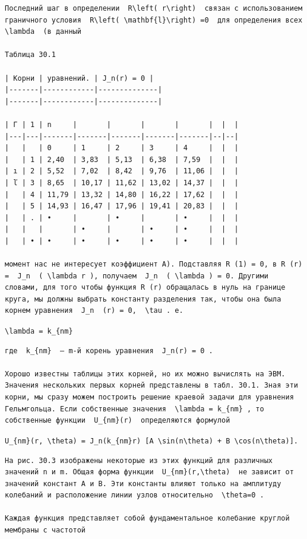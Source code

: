 \documentclass[
  ukrainian,
]{article}
\begin{document}
\begin{verbatim}
Последний шаг в определении  R\left( r\right)  связан с использованием граничного условия  R\left( \mathbf{l}\right) =0  для определения всех  \lambda  (в данный

Таблица 30.1

| Корни | уравнений. | J_n(r) = 0 |
|-------|------------|--------------|
|-------|------------|--------------|

| Γ | 1 | n     |       |       |       |       |  |  |
|---|---|-------|-------|-------|-------|-------|--|--|
|   |   | 0     | 1     | 2     | 3     | 4     |  |  |
|   | 1 | 2,40  | 3,83  | 5,13  | 6,38  | 7,59  |  |  |
| ı | 2 | 5,52  | 7,02  | 8,42  | 9,76  | 11,06 |  |  |
| ľ | 3 | 8,65  | 10,17 | 11,62 | 13,02 | 14,37 |  |  |
|   | 4 | 11,79 | 13,32 | 14,80 | 16,22 | 17,62 |  |  |
|   | 5 | 14,93 | 16,47 | 17,96 | 19,41 | 20,83 |  |  |
|   | . | •     |       | •     |       | •     |  |  |
|   |   |       | •     |       | •     | •     |  |  |
|   | • | •     | •     | •     | •     | •     |  |  |

момент нас не интересует коэффициент A). Подставляя R (1) = 0, в R (r) =  J_n  ( \lambda r ), получаем  J_n  ( \lambda ) = 0. Другими словами, для того чтобы функция R (r) обращалась в нуль на границе круга, мы должны выбрать константу разделения так, чтобы она была корнем уравнения  J_n  (r) = 0,  \tau . e.
\end{verbatim}

\texttt{\textbackslash{}lambda\ =\ k\_\{nm\}}

\begin{verbatim}
где  k_{nm}  — m-й корень уравнения  J_n(r) = 0 .

Хорошо известны таблицы этих корней, но их можно вычислять на ЭВМ. Значения нескольких первых корней представлены в табл. 30.1. Зная эти корни, мы сразу можем построить решение краевой задачи для уравнения Гельмгольца. Если собственные значения  \lambda = k_{nm} , то собственные функции  U_{nm}(r)  определяются формулой
\end{verbatim}

\texttt{U\_\{nm\}(r,\ \textbackslash{}theta)\ =\ J\_n(k\_\{nm\}r)\ {[}A\ \textbackslash{}sin(n\textbackslash{}theta)\ +\ B\ \textbackslash{}cos(n\textbackslash{}theta){]}.}

\begin{verbatim}
На рис. 30.3 изображены некоторые из этих функций для различных значений n и m. Общая форма функции  U_{nm}(r,\theta)  не зависит от значений констант A и B. Эти константы влияют только на амплитуду колебаний и расположение линии узлов относительно  \theta=0 .

Каждая функция представляет собой фундаментальное колебание круглой мембраны с частотой
\end{verbatim}
\end{document}
